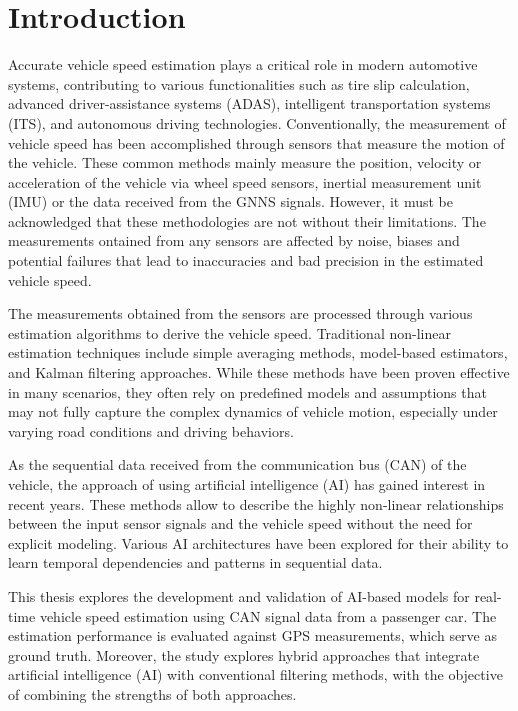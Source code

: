 
\chapter{Introduction}

Accurate vehicle speed estimation plays a critical role in modern automotive systems, contributing to various functionalities such as tire slip calculation, advanced driver-assistance systems (ADAS), intelligent transportation systems (ITS), and autonomous driving technologies. Conventionally, the measurement of vehicle speed has been accomplished through sensors that measure the motion of the vehicle. These common methods mainly measure the position, velocity or acceleration of the vehicle via wheel speed sensors, inertial measurement unit (IMU) or the data received from the GNNS signals. However, it must be acknowledged that these methodologies are not without their limitations. The measurements ontained from any sensors are affected by noise, biases and potential failures that lead to inaccuracies and bad precision in the estimated vehicle speed.

The measurements obtained from the sensors are processed through various estimation algorithms to derive the vehicle speed. Traditional non-linear estimation techniques include simple averaging methods, model-based estimators, and Kalman filtering approaches. While these methods have been proven effective in many scenarios, they often rely on predefined models and assumptions that may not fully capture the complex dynamics of vehicle motion, especially under varying road conditions and driving behaviors.

As the sequential data received from the communication bus (CAN) of the vehicle, the approach of using artificial intelligence (AI) has gained interest in recent years. These methods allow to describe the highly non-linear relationships between the input sensor signals and the vehicle speed without the need for explicit modeling. Various AI architectures have been explored for their ability to learn temporal dependencies and patterns in sequential data. 

This thesis explores the development and validation of AI-based models for real-time vehicle speed estimation using CAN signal data from a passenger car. The estimation performance is evaluated against GPS measurements, which serve as ground truth. Moreover, the study explores hybrid approaches that integrate artificial intelligence (AI) with conventional filtering methods, with the objective of combining the strengths of both approaches.

